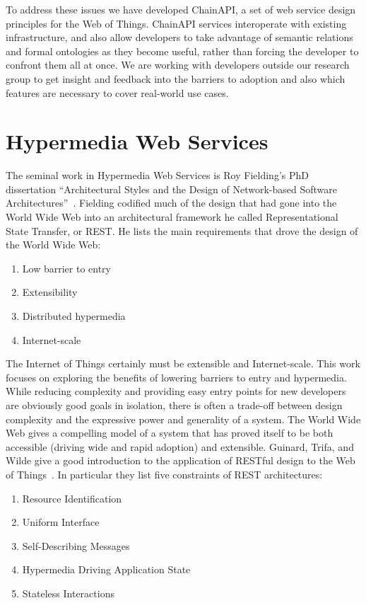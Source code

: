 \documentclass{acm_proc_article-sp}
\newenvironment{tightenumerate}{
    \vspace{-10pt}
    \begin{enumerate}
        \setlength{\parskip}{-1pt}}{
    \end{enumerate}
    \vspace{-10pt}}
\begin{document}
To address these issues we have developed ChainAPI, a set of web service design
principles for the Web of Things. ChainAPI services interoperate with existing
infrastructure, and also allow developers to take advantage of semantic
relations and formal ontologies as they become useful, rather than forcing the
developer to confront them all at once. We are working with developers outside
our research group to get insight and feedback into the barriers to adoption
and also which features are necessary to cover real-world use cases.

\section{Hypermedia Web Services}

The seminal work in Hypermedia Web Services is Roy Fielding's PhD dissertation
``Architectural Styles and the Design of Network-based Software
Architectures''~\cite{fielding}. Fielding codified much of the design that had
gone into the World Wide Web into an architectural framework he called
Representational State Transfer, or REST. He lists the main requirements that
drove the design of the World Wide Web:

\begin{tightenumerate}
    \item Low barrier to entry
    \item Extensibility
    \item Distributed hypermedia
    \item Internet-scale
\end{tightenumerate}

The Internet of Things certainly must be extensible and Internet-scale. This
work focuses on exploring the benefits of lowering barriers to entry and
hypermedia. While reducing complexity and providing easy entry points for new
developers are obviously good goals in isolation, there is often a trade-off
between design complexity and the expressive power and generality of a system.
The World Wide Web gives a compelling model of a system that has
proved itself to be both accessible (driving wide and rapid adoption) and
extensible. Guinard, Trifa, and Wilde give a good introduction to the
application of RESTful design to the Web of Things~\cite{guinard2010}. In
particular they list five constraints of REST architectures:

\begin{tightenumerate}
    \item Resource Identification
    \item Uniform Interface
    \item Self-Describing Messages
    \item Hypermedia Driving Application State
    \item Stateless Interactions
\end{tightenumerate}
\end{document}
